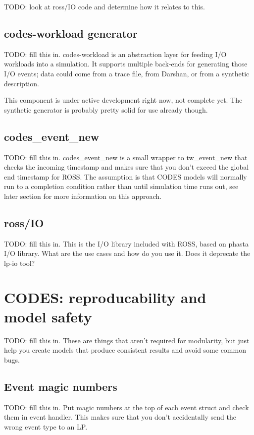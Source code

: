 \documentclass[conference,10pt,compsocconf,onecolumn]{IEEEtran}
\begin{document}
TODO: look at ross/IO code and determine how it relates to this.

\subsection{codes-workload generator}

TODO: fill this in.  codes-workload is an abstraction layer for feeding I/O
workloads into a simulation.  It supports multiple back-ends for generating
those I/O events; data could come from a trace file, from Darshan, or from a
synthetic description.

This component is under active development right now, not complete yet.  The
synthetic generator is probably pretty solid for use already though.

\subsection{codes\_event\_new}

TODO: fill this in.  codes\_event\_new is a small wrapper to tw\_event\_new
that checks the incoming timestamp and makes sure that you don't exceed the
global end timestamp for ROSS.  The assumption is that CODES models will
normally run to a completion condition rather than until simulation time
runs out, see later section for more information on this approach.

\subsection{ross/IO}

TODO: fill this in.  This is the I/O library included with ROSS, based on
phasta I/O library.  What are the use cases and how do you use it. Does it
deprecate the lp-io tool?

\section{CODES: reproducability and model safety}

TODO: fill this in.  These are things that aren't required for modularity,
but just help you create models that produce consistent results and avoid
some common bugs.

\subsection{Event magic numbers}

TODO: fill this in.  Put magic numbers at the top of each event struct and
check them in event handler.  This makes sure that you don't accidentally
send the wrong event type to an LP.
\end{document}
